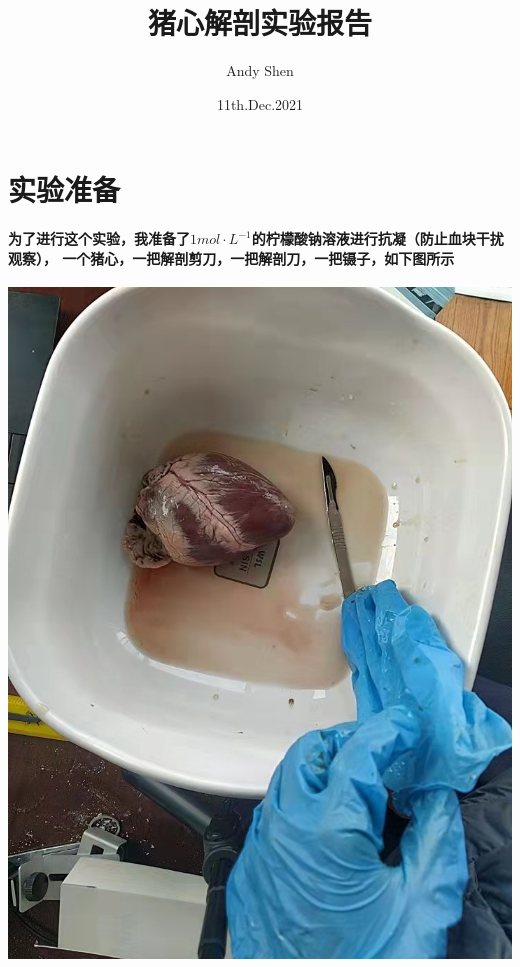 \documentclass[final,11pt,oneside,UTF8]{report}
\title{猪心解剖实验报告}
\author{Andy Shen}
\date{11th.Dec.2021}
\begin{document}
\maketitle
\section{实验准备}
\paragraph{
    为了进行这个实验，我准备了$1mol\cdot L^{-1}$的柠檬酸钠溶液进行抗凝（防止血块干扰观察），
    一个猪心，一把解剖剪刀，一把解剖刀，一把镊子，如下图所示
}
\begin{center}
    \includegraphics[scale=0.12,angle=0]{photos/start.jpg}
\end{center}
\end{document}
